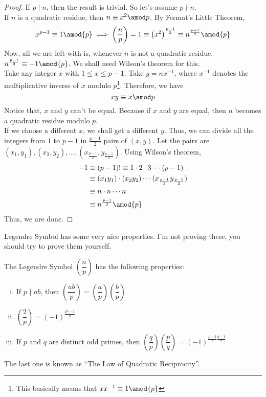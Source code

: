 \documentclass[11pt]{scrartcl}
\begin{document}
\begin{proof}
If \(p\mid n\), then the result is trivial. So let's assume \(p\nmid n\). \\
If \(n\) is a quadratic residue, then \(n \equiv x^2 \amod p\). By Fermat's Little Theorem,
\[x^{p-1} \equiv 1 \amod{p} \implies \left(\dfrac{n}{p}\right) = 1 \equiv \left(x^2\right)^{\frac{p-1}{2}} \equiv n^{\frac{p-1}{2}} \amod{p}\]
Now, all we are left with is, whenever \(n\) is not a quadratic residue, \(n^{\frac{p-1}{2}} \equiv -1 \amod{p}\). We shall need Wilson's theorem for this. \\
Take any integer \(x\) with \(1 \leq x \leq p-1\). Take \(y = nx^{-1}\), where \(x^{-1}\) denotes the multiplicative inverse of \(x\) modulo \(p\)\footnote{This basically means that \(xx^{-1} \equiv 1 \amod{p}\)}. Therefore, we have
\[ xy \equiv x \amod p\]
Notice that, \(x\) and \(y\) can't be equal. Because if \(x\) and \(y\) are equal, then \(n\) becomes a quadratic residue modulo \(p\). \\
If we choose a different \(x\), we shall get a different \(y\). Thus, we can divide all the integers from \(1\) to \(p-1\) in \(\frac{p-1}{2}\) pairs of \((x,y)\). Let the pairs are \((x_1, y_1), (x_2, y_2), \ldots, (x_{\frac{p-1}{2}}, y_{\frac{p-1}{2}})\). Using Wilson's theorem,
\begin{equation*}
\begin{split}
-1 &\equiv (p-1)! \equiv 1 \cdot 2 \cdot 3 \cdots (p-1) \\
&\equiv (x_1y_1)\cdot (x_2y_2) \cdots (x_{\frac{p-1}{2}} y_{\frac{p-1}{2}}) \\
&\equiv n \cdot n \cdots n \\
&\equiv n^{\frac{p-1}{2}} \amod{p}
\end{split}
\end{equation*}
Thus, we are done.
\end{proof}
Legendre Symbol has some very nice properties. I'm not proving these, you should try to prove them yourself.
\begin{lemma}
The Legendre Symbol \(\left(\dfrac{n}{p}\right) \) has the following properties:
\begin{enumerate}[i.]
\item If \(p\nmid ab\), then \(\left(\dfrac{ab}{p}\right) = \left(\dfrac{a}{p}\right) \left(\dfrac{b}{p}\right)\)
\item \(\left(\dfrac{2}{p}\right) = (-1)^{\frac{p^2-1}{8}}\)\\
\item If \(p\) and \(q\) are distinct odd primes, then 
\(\left(\dfrac{q}{p}\right)\left(\dfrac{p}{q}\right) = (-1)^{\frac{p-1}{2} \frac{q-1}{2}}\)
\end{enumerate}
\end{lemma}
The last one is known as ``The Law of Quadratic Reciprocity''.
\pagebreak
\end{document}
